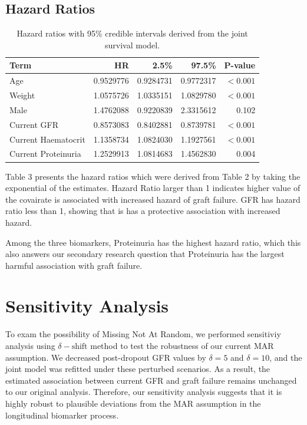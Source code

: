 \documentclass[11pt]{article}
\begin{document}
\FloatBarrier
\subsection*{Hazard Ratios}
\begin{table}[ht]
\centering
\renewcommand{\arraystretch}{1.25}
\setlength{\tabcolsep}{10pt}
\begin{tabular}{lrrrr}
\toprule
Term & HR & 2.5\% & 97.5\% & P-value \\
\midrule
Age & 0.9529776 & 0.9284731 & 0.9772317 & $<0.001$ \\
Weight & 1.0575726 & 1.0335151 & 1.0829780 & $<0.001$ \\
Male & 1.4762088 & 0.9220839 & 2.3315612 & 0.102 \\
Current GFR & 0.8573083 & 0.8402881 & 0.8739781 & $<0.001$ \\
Current Haematocrit & 1.1358734 & 1.0824030 & 1.1927561 & $<0.001$ \\
Current Proteinuria & 1.2529913 & 1.0814683 & 1.4562830 & 0.004 \\
\bottomrule
\end{tabular}
\caption{Hazard ratios with 95\% credible intervals derived from the joint survival model.}
\label{tab:hazard_ratio}
\end{table}
\FloatBarrier

Table 3 presents the hazard ratios which were derived from Table 2 by taking the exponential of the estimates. Hazard Ratio larger than 1 indicates higher value of the covairate is associated with increased hazard of graft failure. GFR has hazard ratio less than 1, showing that is has a protective association with increased hazard.

Among the three biomarkers, Proteinuria has the highest hazard ratio, which this also answers our secondary research question that Proteinuria has the largest harmful association with graft failure.

\section{Sensitivity Analysis}
To exam the possibility of Missing Not At Random, we performed sensitiviy analysis using $\delta-\text{shift}$ method to test the robustness of our current MAR assumption. We decreased post-dropout GFR values by $\delta=5$ and $\delta=10$, and the joint model was refitted under these perturbed scenarios. As a result, the estimated association between current GFR and graft failure remains unchanged to our original analysis. Therefore, our sensitivity analysis suggests that it is highly robust to plausible deviations from the MAR assumption in the longitudinal biomarker process.
\end{document}
